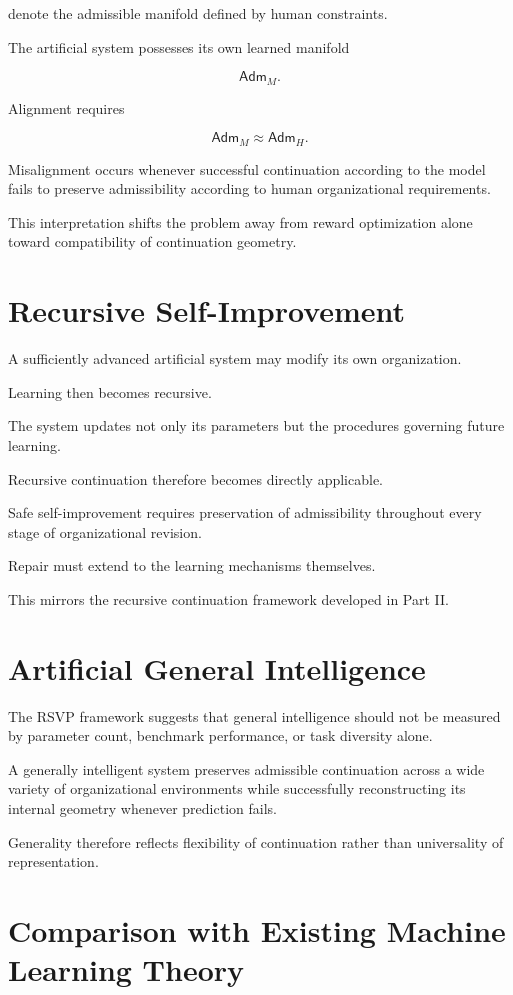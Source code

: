 \documentclass[11pt,oneside]{book}
\numberwithin{equation}{chapter}
\theoremstyle{definition}
\theoremstyle{plain}
\newcommand{\Adm}{\mathsf{Adm}}
\begin{document}
denote the admissible manifold defined by human constraints.

The artificial system possesses its own learned manifold

\[
\Adm_M.
\]

Alignment requires

\[
\Adm_M
\approx
\Adm_H.
\]

Misalignment occurs whenever successful continuation according to the model
fails to preserve admissibility according to human organizational
requirements.

This interpretation shifts the problem away from reward optimization alone
toward compatibility of continuation geometry.

\section{Recursive Self-Improvement}

A sufficiently advanced artificial system may modify its own organization.

Learning then becomes recursive.

The system updates not only its parameters but the procedures governing
future learning.

Recursive continuation therefore becomes directly applicable.

Safe self-improvement requires preservation of admissibility throughout
every stage of organizational revision.

Repair must extend to the learning mechanisms themselves.

This mirrors the recursive continuation framework developed in Part II.

\section{Artificial General Intelligence}

The RSVP framework suggests that general intelligence should not be
measured by parameter count, benchmark performance, or task diversity
alone.

A generally intelligent system preserves admissible continuation across a
wide variety of organizational environments while successfully
reconstructing its internal geometry whenever prediction fails.

Generality therefore reflects flexibility of continuation rather than
universality of representation.

\section{Comparison with Existing Machine Learning Theory}
\end{document}
